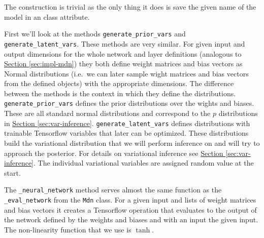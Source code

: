 \documentclass[12pt,a4paper,twoside]{scrartcl}
\numberwithin{equation}{section}
\newcommand{\refsec}[1]{\hyperref[#1]{Section \ref*{#1}}}
\begin{document}
The construction is trivial as the only thing it does is save the given name of the model in an class attribute.

First we'll look at the methods \texttt{generate\_prior\_vars} and \texttt{generate\_latent\_vars}. These methods are very similar. For given input and output dimensions for the whole network and layer definitions (analogous to \refsec{sec:impl-mdn}) they both define weight matrices and bias vectors as Normal distributions (i.e.\ we can later sample wight matrices and bias vectors from the defined objects) with the appropriate dimensions. The difference between the methods is the context in which they define the distributions. \texttt{generate\_prior\_vars} defines the prior distributions over the wights and biases. These are all standard normal distributions and correspond to the \(p\) distributions in \refsec{sec:var-inference}. \texttt{generate\_latent\_vars} defines distributions with trainable Tensorflow variables that later can be optimized. These distributions build the variational distribution that we will perform inference on and will try to approach the posterior. For details on variational inference see \refsec{sec:var-inference}. The individual variational variables are assigned random value at the start. 

The \texttt{\_neural\_network} method serves almost the same function as the \texttt{\_eval\_network} from the \texttt{Mdn} class. For a given input and lists of weight matrices and bias vectors it creates a Tensorflow operation that evaluates to the output of the network defined by the weights and biases and with an input the given input. The non-linearity function that we use is \(\tanh\). 
\end{document}
